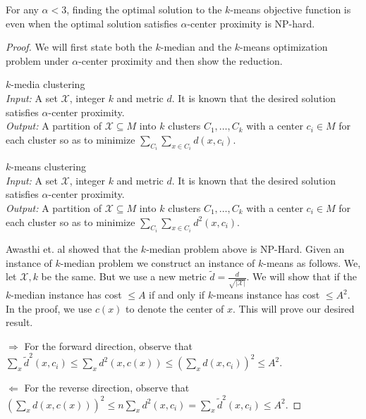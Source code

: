\documentclass[orivec]{llncs}
\newcommand{\mc}{\mathcal}
\begin{document}
\begin{theorem}
For any $\alpha < 3$, finding the optimal solution to the $k$-means objective function is even when the optimal solution satisfies $\alpha$-center proximity is NP-hard.
\end{theorem}

\begin{proof}
We will first state both the $k$-median and the $k$-means optimization problem under $\alpha$-center proximity and then show the reduction.

\vspace{1em}\noindent $k$-media clustering\\
{\it Input:} A set $\mc X$, integer $k$ and metric $d$. It is known that the desired solution satisfies $\alpha$-center proximity.\\
{\it Output:} A partition of $\mc X \subseteq M$ into $k$ clusters $C_1, \ldots, C_k$ with a center $c_i \in M$ for each cluster so as to minimize $\sum_{C_i}\sum_{x \in C_i} d(x, c_i)$.  

\vspace{0.5em}\noindent $k$-means clustering\\
{\it Input:} A set $\mc X$, integer $k$ and metric $d$. It is known that the desired solution satisfies $\alpha$-center proximity.\\
{\it Output:} A partition of $\mc X \subseteq M$ into $k$ clusters $C_1, \ldots, C_k$ with a center $c_i \in M$ for each cluster so as to minimize $\sum_{C_i}\sum_{x \in C_i} d^2(x, c_i)$.  

\vspace{1em}\noindent Awasthi et. al \cite{awasthi2012center} showed that the $k$-median problem above is NP-Hard. Given an instance of $k$-median problem we construct an instance of $k$-means as follows. We, let $\mc X, k$ be the same. But we use a new metric $\tilde d = \frac{d}{\sqrt{|\mc X|}}$. We will show that if the $k$-median instance has cost $\le A$ if and only if $k$-means instance has cost $\le A^2$. In the proof, we use $c(x)$ to denote the center of $x$. This will prove our desired result.

\noindent$\Rightarrow$ For the forward direction, observe that $\sum_x \tilde d^{2}(x, c_i) \le\sum_{x}d^2(x, c(x)) \le (\sum_{x} d(x, c_i))^2 \le A^2$.

\noindent$\Leftarrow$ For the reverse direction, observe that $(\sum_{x}d(x, c(x)))^2 \le n\sum_{x} d^2(x, c_i) = \sum_x \tilde d^{2}(x, c_i) \le A^2$.
\end{proof}
\end{document}
